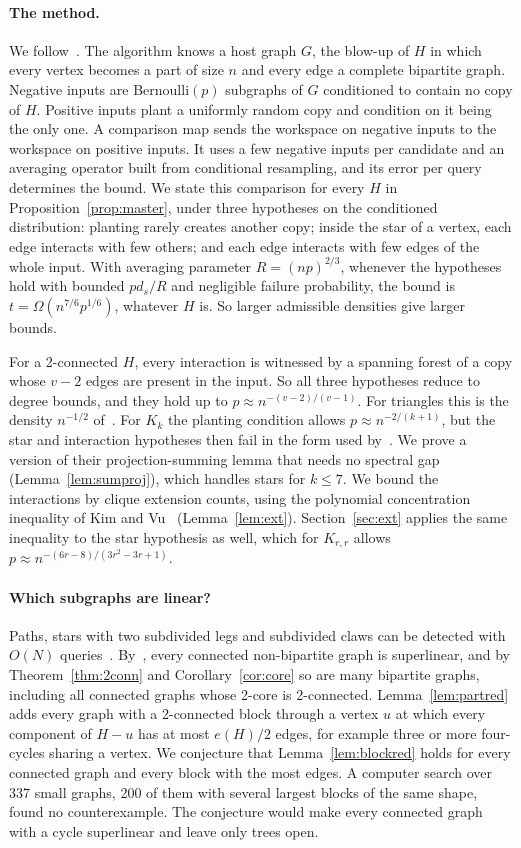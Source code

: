 \documentclass[11pt]{article}
\theoremstyle{remark}
\begin{document}
\paragraph{The method.} We follow~\cite{CGZ26}. The algorithm knows a host graph $G$, the blow-up of $H$ in which every vertex becomes a part of size $n$ and every edge a complete bipartite graph. Negative inputs are Bernoulli$(p)$ subgraphs of $G$ conditioned to contain no copy of $H$. Positive inputs plant a uniformly random copy and condition on it being the only one. A comparison map sends the workspace on negative inputs to the workspace on positive inputs. It uses a few negative inputs per candidate and an averaging operator built from conditional resampling, and its error per query determines the bound. We state this comparison for every $H$ in Proposition~\ref{prop:master}, under three hypotheses on the conditioned distribution: planting rarely creates another copy; inside the star of a vertex, each edge interacts with few others; and each edge interacts with few edges of the whole input. With averaging parameter $R=(np)^{2/3}$, whenever the hypotheses hold with bounded $pd_s/R$ and negligible failure probability, the bound is $t=\Omega(n^{7/6}p^{1/6})$, whatever $H$ is. So larger admissible densities give larger bounds.

For a 2-connected $H$, every interaction is witnessed by a spanning forest of a copy whose $v-2$ edges are present in the input. So all three hypotheses reduce to degree bounds, and they hold up to $p\approx n^{-(v-2)/(v-1)}$. For triangles this is the density $n^{-1/2}$ of~\cite{CGZ26}. For $K_k$ the planting condition allows $p\approx n^{-2/(k+1)}$, but the star and interaction hypotheses then fail in the form used by~\cite{CGZ26}. We prove a version of their projection-summing lemma that needs no spectral gap (Lemma~\ref{lem:sumproj}), which handles stars for $k\le7$. We bound the interactions by clique extension counts, using the polynomial concentration inequality of Kim and Vu~\cite{KV00} (Lemma~\ref{lem:ext}). Section~\ref{sec:ext} applies the same inequality to the star hypothesis as well, which for $K_{r,r}$ allows $p\approx n^{-(6r-8)/(3r^2-3r+1)}$.

\paragraph{Which subgraphs are linear?} Paths, stars with two subdivided legs and subdivided claws can be detected with $O(N)$ queries~\cite{BR12}. By~\cite{CGZ26,GZ26}, every connected non-bipartite graph is superlinear, and by Theorem~\ref{thm:2conn} and Corollary~\ref{cor:core} so are many bipartite graphs, including all connected graphs whose 2-core is 2-connected. Lemma~\ref{lem:partred} adds every graph with a 2-connected block through a vertex $u$ at which every component of $H-u$ has at most $e(H)/2$ edges, for example three or more four-cycles sharing a vertex. We conjecture that Lemma~\ref{lem:blockred} holds for every connected graph and every block with the most edges. A computer search over 337 small graphs, 200 of them with several largest blocks of the same shape, found no counterexample. The conjecture would make every connected graph with a cycle superlinear and leave only trees open.
\end{document}
